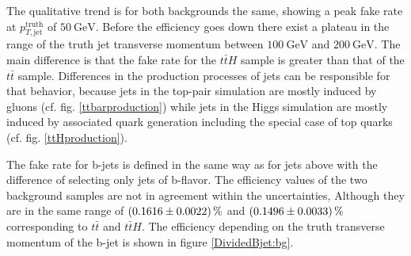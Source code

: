 %
The qualitative trend is for both backgrounds the same, showing a peak fake rate at $p_{T,\text{jet}}^{\text{truth}}$ of $\SI{50}{\giga\electronvolt}$. Before the efficiency goes down there exist a plateau in the range of the truth jet transverse momentum between $\SI{100}{\giga\electronvolt}$ and $\SI{200}{\giga\electronvolt}$. The main difference is that the fake rate for the $t\bar{t}H$ sample is greater than that of the $t\bar{t}$ sample. Differences in the production processes of jets can be responsible for that behavior, because jets in the top-pair simulation are mostly induced by gluons (cf. fig. \ref{ttbarproduction}) while jets in the Higgs simulation are mostly induced by associated quark generation including the special case of top quarks (cf. fig. \ref{ttHproduction}).\par
The fake rate for b-jets is defined in the same way as for jets above with the difference of selecting only jets of b-flavor. The efficiency values of the two background samples are not in agreement within the uncertainties, Although they are in the same range of $\SI{0.1616\pm 0.0022}{\percent}$ and $\SI{0.1496\pm 0.0033}{\percent}$ corresponding to $t\bar{t}$ and $t\bar{t}H$. The efficiency depending on the truth transverse momentum of the b-jet is shown in figure \ref{DividedBjet:bg}.
%
